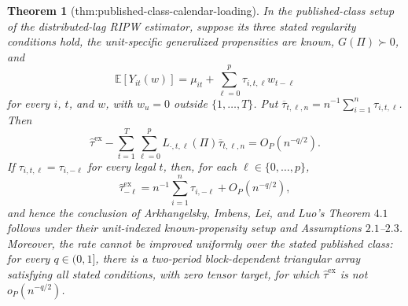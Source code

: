 \documentclass{article}
\newtheorem{theorem}{Theorem}
\begin{document}
\begin{theorem}[thm:published-class-calendar-loading]\label{thm:published-class-calendar-loading}
In the published-class setup of the distributed-lag RIPW estimator, suppose its three stated regularity conditions hold, the unit-specific generalized propensities are known, \(G(\Pi)\succ0\), and
\[
 \mathbb E[Y_{it}(w)]=\mu_{it}+\sum_{\ell=0}^{p}\tau_{i,t,\ell}w_{t-\ell}
\]
for every \(i\), \(t\), and \(w\), with \(w_u=0\) outside \(\{1,\ldots,T\}\). Put \(\overline\tau_{t,\ell,n}=n^{-1}\sum_{i=1}^{n}\tau_{i,t,\ell}\). Then
\[
 \widehat\tau^{\mathrm{ex}}-
 \sum_{t=1}^{T}\sum_{\ell=0}^{p}L_{\cdot,t,\ell}(\Pi)\overline\tau_{t,\ell,n}
 =O_P(n^{-q/2}).
\]
If \(\tau_{i,t,\ell}=\tau_{i,-\ell}\) for every legal \(t\), then, for each \(\ell\in\{0,\ldots,p\}\),
\[
 \widehat\tau^{\mathrm{ex}}_{-\ell}
 =n^{-1}\sum_{i=1}^{n}\tau_{i,-\ell}+O_P(n^{-q/2}),
\]
and hence the conclusion of Arkhangelsky, Imbens, Lei, and Luo's Theorem \(4.1\) follows under their unit-indexed known-propensity setup and Assumptions \(2.1\)--\(2.3\).
Moreover, the rate cannot be improved uniformly over the stated published class: for every \(q\in(0,1]\), there is a two-period block-dependent triangular array satisfying all stated conditions, with zero tensor target, for which \(\widehat\tau^{\mathrm{ex}}\) is not \(o_P(n^{-q/2})\).
\end{theorem}
\end{document}
